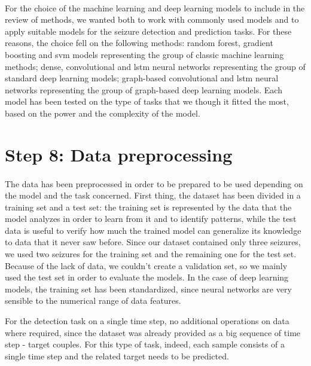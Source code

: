 \paragraph{} For the choice of the machine learning and deep learning models to include in the review of methods, we wanted both to work with commonly used models and to apply suitable models for the seizure detection and prediction tasks. For these reasons, the choice fell on the following methods: random forest, gradient boosting and \acs{svm} models representing the group of classic machine learning methods; dense, convolutional and \acs{lstm} neural networks representing the group of standard deep learning models; graph-based convolutional and \acs{lstm} neural networks representing the group of graph-based deep learning models. Each model has been tested on the type of tasks that we though it fitted the most, based on the power and the complexity of the model.


\section{Step 8: Data preprocessing} \label{sec: step_data_preprocessing}
\paragraph{} The data has been preprocessed in order to be prepared to be used depending on the model and the task concerned. First thing, the dataset has been divided in a training set and a test set: the training set is represented by the data that the model analyzes in order to learn from it and to identify patterns, while the test data is useful to verify how much the trained model can generalize its knowledge to data that it never saw before. Since our dataset contained only three seizures, we used two seizures for the training set and the remaining one for the test set. Because of the lack of data, we couldn't create a validation set, so we mainly used the test set in order to evaluate the models. In the case of deep learning models, the training set has been standardized, since neural networks are very sensible to the numerical range of data features.

For the detection task on a single time step, no additional operations on data where required, since the dataset was already provided as a big sequence of time step - target couples. For this type of task, indeed, each sample consists of a single time step and the related target needs to be predicted.

